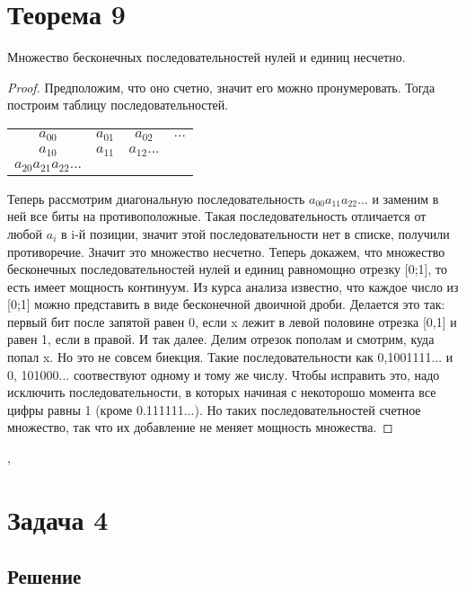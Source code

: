 \documentclass[a4paper,12pt]{article}
\begin{document}
	\section*{Теорема 9}
	\begin{theorem}
		Множество бесконечных последовательностей нулей и единиц несчетно. 
	\end{theorem}

	\begin{proof}
		Предположим, что оно счетно, значит его можно пронумеровать. Тогда построим таблицу
		последовательностей.
		\begin{center}
			\begin{tabular}{cccc}
				$a_{00}$ & $a_{01}$ & $a_{02}$ & $\ldots$ \\
				$a_{10}$ & $a_{11}$ & $a_{12} ...$ \\
				$a_{20} a_{21} a_{22} ...$ \\
			\end{tabular}
		\end{center}
		
		
		Теперь рассмотрим диагональную последовательность  $a_{00} a_{11} a_{22} ...$ и
		заменим в ней все биты на противоположные. Такая последовательность отличается
		от любой $a_{i}$ в i-й позиции, значит этой последовательности нет в списке,
		получили противоречие. Значит это множество несчетно.
		Теперь докажем, что множество бесконечных последовательностей нулей и единиц равномощно
		отрезку [0;1], то есть имеет мощность континуум.
		Из курса анализа известно, что каждое число из [0;1] можно представить в виде
		бесконечной двоичной дроби. Делается это так: первый бит после запятой равен 0, если
		x лежит в левой половине отрезка [0,1] и равен 1, если в правой. И так далее. Делим
		отрезок пополам и смотрим, куда попал x. Но это не совсем биекция. Такие последовательности
		как 0,1001111... и 0, 101000... соотвествуют одному и тому же числу. Чтобы исправить
		это, надо исключить последовательности, в которых начиная с некоторошо момента все
		цифры равны 1 (кроме 0.111111...). Но таких последовательностей счетное множество, так
		что их добавление не меняет мощность множества.
	\end{proof}

	
	\sep	
	
	\section*{Задача 4}

	\subsection*{Решение}
\end{document}
